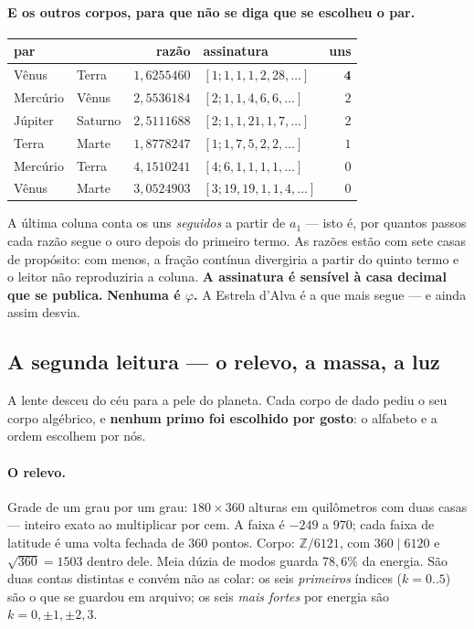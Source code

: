\documentclass[11pt]{article}
\newcommand{\Z}{\mathbb Z}
\theoremstyle{plain}
\theoremstyle{remark}
\begin{document}
\paragraph{E os outros corpos, para que não se diga que se escolheu o par.}

\begin{center}
\begin{tabular}{@{}llrl r@{}}
\toprule
par & & razão & assinatura & uns \\
\midrule
Vênus & Terra & $1{,}6255460$ & $[1;1,1,1,2,28,\dots]$ & $\mathbf{4}$ \\
Mercúrio & Vênus & $2{,}5536184$ & $[2;1,1,4,6,6,\dots]$ & $2$ \\
Júpiter & Saturno & $2{,}5111688$ & $[2;1,1,21,1,7,\dots]$ & $2$ \\
Terra & Marte & $1{,}8778247$ & $[1;1,7,5,2,2,\dots]$ & $1$ \\
Mercúrio & Terra & $4{,}1510241$ & $[4;6,1,1,1,1,\dots]$ & $0$ \\
Vênus & Marte & $3{,}0524903$ & $[3;19,19,1,1,4,\dots]$ & $0$ \\
\bottomrule
\end{tabular}
\end{center}

\noindent A última coluna conta os uns \emph{seguidos} a partir de $a_1$ ---
isto é, por quantos passos cada razão segue o ouro depois do primeiro termo.
As razões estão com sete casas de propósito: com menos, a fração contínua
divergiria a partir do quinto termo e o leitor não reproduziria a coluna.
\textbf{A assinatura é sensível à casa decimal que se publica.} \textbf{Nenhuma é $\varphi$.} A Estrela d'Alva é a que mais
segue --- e ainda assim desvia.

\subsection{A segunda leitura --- o relevo, a massa, a luz}

A lente desceu do céu para a pele do planeta. Cada corpo de dado pediu o seu
corpo algébrico, e \textbf{nenhum primo foi escolhido por gosto}: o alfabeto e
a ordem escolhem por nós.

\paragraph{O relevo.} Grade de um grau por um grau: $180\times360$ alturas em
quilômetros com duas casas --- inteiro exato ao multiplicar por cem. A faixa é
$-249$ a $970$; cada faixa de latitude é uma volta fechada de $360$ pontos.
Corpo: $\Z/6121$, com $360\mid6120$ e $\sqrt{360}=1503$ dentro dele. Meia dúzia
de modos guarda $78{,}6\%$ da energia. São duas contas distintas e convém não
as colar: os seis \emph{primeiros} índices ($k=0..5$) são o que se guardou em
arquivo; os seis \emph{mais fortes} por energia são $k=0,\pm1,\pm2,3$.
\end{document}
